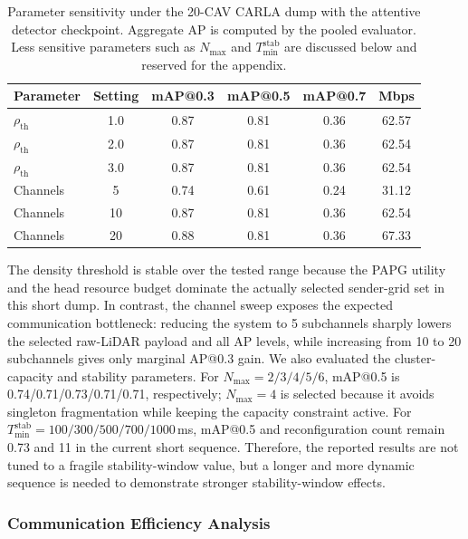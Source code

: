 \documentclass[conference]{IEEEtran}
\begin{document}
\begin{table}[htbp]
\centering
\caption{Parameter sensitivity under the 20-CAV CARLA dump with the attentive detector checkpoint. Aggregate AP is computed by the pooled evaluator. Less sensitive parameters such as $N_{\max}$ and $T_{\min}^{\mathrm{stab}}$ are discussed below and reserved for the appendix.}
\label{tab:param_sensitivity}
\begin{tabular}{|l|c|ccc|c|}
\hline
Parameter & Setting & mAP@0.3 & mAP@0.5 & mAP@0.7 & Mbps \\
\hline
$\rho_{\mathrm{th}}$ & 1.0 & 0.87 & 0.81 & 0.36 & 62.57 \\
$\rho_{\mathrm{th}}$ & 2.0 & 0.87 & 0.81 & 0.36 & 62.54 \\
$\rho_{\mathrm{th}}$ & 3.0 & 0.87 & 0.81 & 0.36 & 62.54 \\
\hline
Channels & 5 & 0.74 & 0.61 & 0.24 & 31.12 \\
Channels & 10 & 0.87 & 0.81 & 0.36 & 62.54 \\
Channels & 20 & 0.88 & 0.81 & 0.36 & 67.33 \\
\hline
\end{tabular}
\end{table}

The density threshold is stable over the tested range because the PAPG utility and the head resource budget dominate the actually selected sender-grid set in this short dump. In contrast, the channel sweep exposes the expected communication bottleneck: reducing the system to 5 subchannels sharply lowers the selected raw-LiDAR payload and all AP levels, while increasing from 10 to 20 subchannels gives only marginal AP@0.3 gain. We also evaluated the cluster-capacity and stability parameters. For $N_{\max}=2/3/4/5/6$, mAP@0.5 is 0.74/0.71/0.73/0.71/0.71, respectively; $N_{\max}=4$ is selected because it avoids singleton fragmentation while keeping the capacity constraint active. For $T_{\min}^{\mathrm{stab}}=100/300/500/700/1000$\,ms, mAP@0.5 and reconfiguration count remain 0.73 and 11 in the current short sequence. Therefore, the reported results are not tuned to a fragile stability-window value, but a longer and more dynamic sequence is needed to demonstrate stronger stability-window effects.


\subsubsection{Communication Efficiency Analysis}
\end{document}
